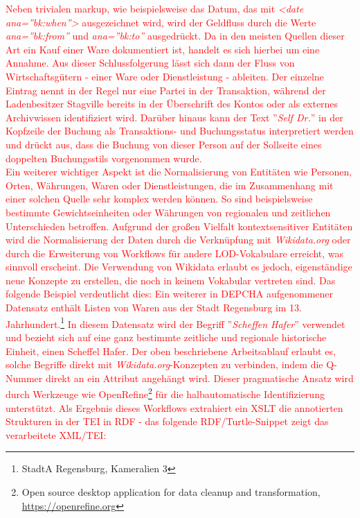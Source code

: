 \documentclass[12pt,a4paper]{article}
\begin{document}
\textcolor{red}{
Neben trivialen markup, wie beispielsweise das Datum, das mit \textit{<date ana=''bk:when''>} ausgezeichnet wird, wird der Geldfluss durch die Werte \textit{ana=''bk:from''} und \textit{ana=''bk:to''} ausgedrückt. Da in den meisten Quellen dieser Art ein Kauf einer Ware dokumentiert ist, handelt es sich hierbei um eine Annahme. Aus dieser Schlussfolgerung lässt sich dann der Fluss von Wirtschaftsgütern - einer Ware oder Dienstleistung - ableiten. Der einzelne Eintrag nennt in der Regel nur eine Partei in der Transaktion, während der Ladenbesitzer Stagville bereits in der Überschrift des Kontos oder als externes Archivwissen identifiziert wird. Darüber hinaus kann der Text ''\textit{Self Dr.}'' in der Kopfzeile der Buchung als Transaktions- und Buchungsstatus interpretiert werden und drückt aus, dass die Buchung von dieser Person auf der Sollseite eines doppelten Buchungsstils vorgenommen wurde.
\\
Ein weiterer wichtiger Aspekt ist die Normalisierung von Entitäten wie Personen, Orten, Währungen, Waren oder Dienstleistungen, die im Zusammenhang mit einer solchen Quelle sehr komplex werden können. So sind beispielsweise bestimmte Gewichtseinheiten oder Währungen von regionalen und zeitlichen Unterschieden betroffen. Aufgrund der großen Vielfalt kontextsensitiver Entitäten wird die Normalisierung der Daten durch die Verknüpfung mit \textit{Wikidata.org} oder durch die Erweiterung von Workflows für andere LOD-Vokabulare erreicht, was sinnvoll erscheint. Die Verwendung von Wikidata erlaubt es jedoch, eigenständige neue Konzepte zu erstellen, die noch in keinem Vokabular vertreten sind. Das folgende Beispiel verdeutlicht dies: Ein weiterer in DEPCHA aufgenommener Datensatz enthält Listen von Waren aus der Stadt Regensburg im 13. Jahrhundert.\footnote{StadtA Regensburg, Kameralien 3} In diesem Datensatz wird der Begriff ''\textit{Scheffen Hafer}'' verwendet und bezieht sich auf eine ganz bestimmte zeitliche und regionale historische Einheit, einen Scheffel Hafer. Der oben beschriebene Arbeitsablauf erlaubt es, solche Begriffe direkt mit \textit{Wikidata.org}-Konzepten zu verbinden, indem die Q-Nummer direkt an ein Attribut angehängt wird. Dieser pragmatische Ansatz wird durch Werkzeuge wie OpenRefine\footnote{Open source desktop application for data cleanup and transformation, \url{https://openrefine.org}} für die halbautomatische Identifizierung unterstützt. Als Ergebnis dieses Workflows extrahiert ein XSLT die annotierten Strukturen in der TEI in RDF - das folgende RDF/Turtle-Snippet zeigt das verarbeitete XML/TEI:
}
\end{document}
